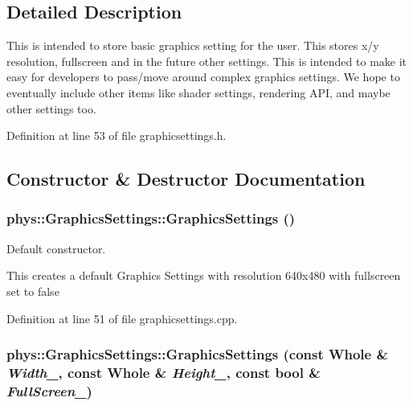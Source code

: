 \subsection{Detailed Description}
This is intended to store basic graphics setting for the user. This stores x/y resolution, fullscreen and in the future other settings. This is intended to make it easy for developers to pass/move around complex graphics settings. We hope to eventually include other items like shader settings, rendering API, and maybe other settings too. 

Definition at line 53 of file graphicsettings.h.



\subsection{Constructor \& Destructor Documentation}
\hypertarget{classphys_1_1GraphicsSettings_aceaaf53585413067adbf271e2c1e48fa}{
\subsubsection[{GraphicsSettings}]{\setlength{\rightskip}{0pt plus 5cm}phys::GraphicsSettings::GraphicsSettings ()}}
\label{dc/df1/classphys_1_1GraphicsSettings_aceaaf53585413067adbf271e2c1e48fa}


Default constructor. 

This creates a default Graphics Settings with resolution 640x480 with fullscreen set to false 

Definition at line 51 of file graphicsettings.cpp.

\hypertarget{classphys_1_1GraphicsSettings_a7cbb84f41101ef66a04e2a0990f796a2}{
\subsubsection[{GraphicsSettings}]{\setlength{\rightskip}{0pt plus 5cm}phys::GraphicsSettings::GraphicsSettings (const {\bf Whole} \& {\em Width\_\-}, \/  const {\bf Whole} \& {\em Height\_\-}, \/  const bool \& {\em FullScreen\_\-})}}
\label{dc/df1/classphys_1_1GraphicsSettings_a7cbb84f41101ef66a04e2a0990f796a2}


